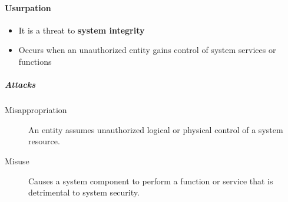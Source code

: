 \documentclass{article}
\begin{document}
                    \paragraph{Usurpation}
                            \begin{itemize}
                                \item It is a threat to \textbf{system integrity}
                                \item Occurs when an unauthorized entity gains control of system services or functions
                            \end{itemize}
                            \subparagraph{Attacks}
                                \begin{description}
                                    \item[Misappropriation]  An entity assumes unauthorized logical or physical control of a system resource.
                                    \item[Misuse]  Causes a system component to perform a function or service that is detrimental to system security.
                                \end{description}
            \newpage
\end{document}
